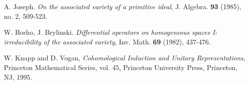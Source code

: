 \documentclass[12pt]{amsart}
\numberwithin{equation}{section}
\begin{document}
\begin{thebibliography}{99}


      A. Joseph. \textit{On the associated variety of a primitive ideal}, J. Algebra. \textbf{93} (1985), no. 2, 509-523.


      W. Borho, J. Brylinski. \textit{Differential operators on homogeneous spaces I: irreducibility of the associated variety}, Inv. Math. \textbf{69} (1982), 437-476.

      W. Knapp and D. Vogan, \textit{Cohomological Induction and Unitary Representations}, Princeton Mathematical Series, vol. 45, Princeton University Press, Princeton, NJ, 1995.



\end{thebibliography}
\end{document}
